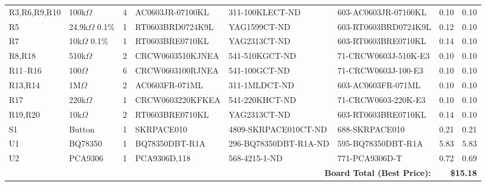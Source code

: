 {\begin{longtable}{@{}llrlp{2.8cm}p{2.5cm}rr@{}}
R3,R6,R9,R10 & 100k$\Omega$ & 4 & AC0603JR-07100KL & 311-100KLECT-ND & 603-AC0603JR-07100KL & 0.10 & 0.10 \\
R5 & 24.9k$\Omega$ 0.1\% & 1 & RT0603BRD0724K9L & YAG1599CT-ND & 603-RT0603BRD0724K9L & 0.12 & 0.10 \\
R7 & 10k$\Omega$ 0.1\% & 1 & RT0603BRE0710KL & YAG2313CT-ND & 603-RT0603BRE0710KL & 0.14 & 0.10 \\
R8,R18 & 510k$\Omega$ & 2 & CRCW0603510KJNEA & 541-510KGCT-ND & 71-CRCW0603J-510K-E3 & 0.10 & 0.10 \\
R11--R16 & 100$\Omega$ & 6 & CRCW0603100RJNEA & 541-100GCT-ND & 71-CRCW0603J-100-E3 & 0.10 & 0.10 \\
R13,R14 & 1M$\Omega$ & 2 & AC0603FR-071ML & 311-1MLDCT-ND & 603-AC0603FR-071ML & 0.10 & 0.10 \\
R17 & 220k$\Omega$ & 1 & CRCW0603220KFKEA & 541-220KHCT-ND & 71-CRCW0603-220K-E3 & 0.10 & 0.10 \\
R19,R20 & 10k$\Omega$ & 2 & RT0603BRE0710KL & YAG2313CT-ND & 603-RT0603BRE0710KL & 0.14 & 0.10 \\
S1 & Button & 1 & SKRPACE010 & 4809-SKRPACE010CT-ND & 688-SKRPACE010 & 0.21 & 0.21 \\
U1 & BQ78350 & 1 & BQ78350DBT-R1A & 296-BQ78350DBT-R1A-ND & 595-BQ78350DBT-R1A & 5.83 & 5.83 \\
U2 & PCA9306 & 1 & PCA9306D,118 & 568-4215-1-ND & 771-PCA9306D-T & 0.72 & 0.69 \\
\midrule
\multicolumn{6}{r}{\textbf{Board Total (Best Price):}} & \multicolumn{2}{r}{\textbf{\$15.18}} \\
\end{longtable}

}
